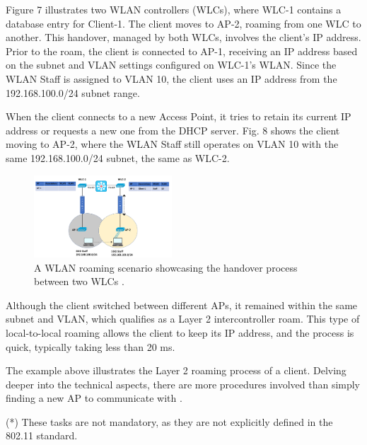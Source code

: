 \documentclass[conference]{IEEEtran}
\begin{document}
Figure 7 illustrates two WLAN controllers (WLCs), where WLC-1 contains a database entry for Client-1. The client moves to AP-2, roaming from one WLC to another. This handover, managed by both WLCs, involves the client’s IP address. Prior to the roam, the client is connected to AP-1, receiving an IP address based on the subnet and VLAN settings configured on WLC-1’s WLAN. Since the WLAN Staff is assigned to VLAN 10, the client uses an IP address from the 192.168.100.0/24 subnet range.

When the client connects to a new Access Point, it tries to retain its current IP address or requests a new one from the DHCP server. Fig. 8 shows the client moving to AP-2, where the WLAN Staff still operates on VLAN 10 with the same 192.168.100.0/24 subnet, the same as WLC-2.

\begin{figure}[htbp]
    \centering
    \includegraphics[width=0.46\textwidth]{fig8_internal_roaming_after_roaming.png}
    \caption{A WLAN roaming scenario showcasing the handover process between two WLCs \cite{study_ccnp}.}
\end{figure}

Although the client switched between different APs, it remained within the same subnet and VLAN, which qualifies as a Layer 2 intercontroller roam. This type of local-to-local roaming allows the client to keep its IP address, and the process is quick, typically taking less than 20 ms.

The example above illustrates the Layer 2 roaming process of a client. Delving deeper into the technical aspects, there are more procedures involved than simply finding a new AP to communicate with \cite{wlan_fundamentals}. 

(*) These tasks are not mandatory, as they are not explicitly defined in the 802.11 standard.
\end{document}
